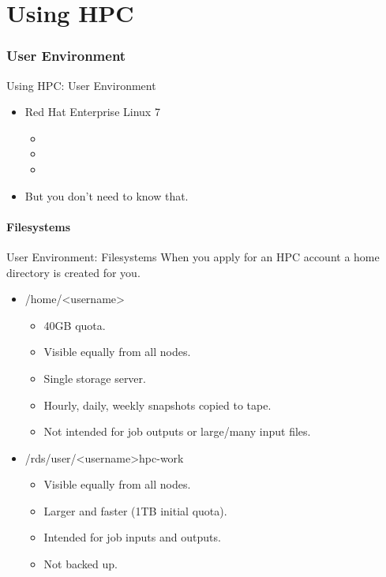 \part{Using HPC}
\begin{frame}
\partpage
\end{frame}

\section{User Environment}
\begin{frame}{Using HPC: User Environment}
\begin{itemize}
\item<1,3->{\alert<1>{{Red Hat Enterprise Linux 7}}}
\begin{itemize}
\item{}
\item{}
\item{}
\end{itemize}
\item<2->{But you don't need to know that.}
\end{itemize}
\end{frame}

\subsection{Filesystems}
\begin{frame}{User Environment: Filesystems}
When you apply for an HPC account a home directory is created for you. 
\begin{itemize}
\item{\alert{/home/<username>}}
\begin{itemize}
\item{40GB quota.}
\item{Visible equally from all nodes.}
\item{Single storage server.}
\item{Hourly, daily, weekly snapshots copied to tape.}
\item{Not intended for job outputs or large/many input files.}
\end{itemize}
\item{\alert{/rds/user/<username>hpc-work}}
\begin{itemize}
\item{Visible equally from all nodes.}
\item{Larger and faster (1TB initial quota).}
\item{Intended for job inputs and outputs.}
\item{{\color{red}Not backed up.}}
 \pause
\end{itemize}
\end{itemize}
\end{frame}

